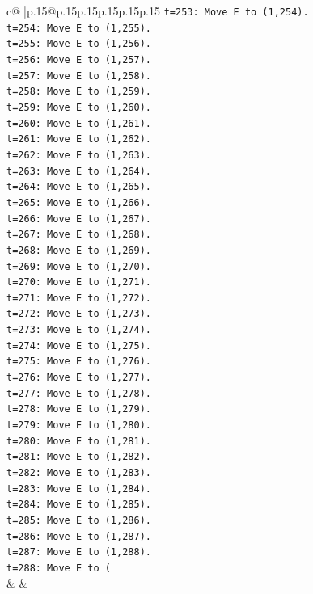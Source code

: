 \documentclass{article}
\begin{document}
{\begin{supertabular}{c@{$\;$}|p{.15\linewidth}@{}p{.15\linewidth}p{.15\linewidth}p{.15\linewidth}p{.15\linewidth}p{.15\linewidth}}
{{{\texttt{t=253: Move E to (1,254).} \\
\texttt{t=254: Move E to (1,255).} \\
\texttt{t=255: Move E to (1,256).} \\
\texttt{t=256: Move E to (1,257).} \\
\texttt{t=257: Move E to (1,258).} \\
\texttt{t=258: Move E to (1,259).} \\
\texttt{t=259: Move E to (1,260).} \\
\texttt{t=260: Move E to (1,261).} \\
\texttt{t=261: Move E to (1,262).} \\
\texttt{t=262: Move E to (1,263).} \\
\texttt{t=263: Move E to (1,264).} \\
\texttt{t=264: Move E to (1,265).} \\
\texttt{t=265: Move E to (1,266).} \\
\texttt{t=266: Move E to (1,267).} \\
\texttt{t=267: Move E to (1,268).} \\
\texttt{t=268: Move E to (1,269).} \\
\texttt{t=269: Move E to (1,270).} \\
\texttt{t=270: Move E to (1,271).} \\
\texttt{t=271: Move E to (1,272).} \\
\texttt{t=272: Move E to (1,273).} \\
\texttt{t=273: Move E to (1,274).} \\
\texttt{t=274: Move E to (1,275).} \\
\texttt{t=275: Move E to (1,276).} \\
\texttt{t=276: Move E to (1,277).} \\
\texttt{t=277: Move E to (1,278).} \\
\texttt{t=278: Move E to (1,279).} \\
\texttt{t=279: Move E to (1,280).} \\
\texttt{t=280: Move E to (1,281).} \\
\texttt{t=281: Move E to (1,282).} \\
\texttt{t=282: Move E to (1,283).} \\
\texttt{t=283: Move E to (1,284).} \\
\texttt{t=284: Move E to (1,285).} \\
\texttt{t=285: Move E to (1,286).} \\
\texttt{t=286: Move E to (1,287).} \\
\texttt{t=287: Move E to (1,288).} \\
\texttt{t=288: Move E to (} \\
            }
        }
    }
    & & \\ \\


\end{supertabular}}
\end{document}

